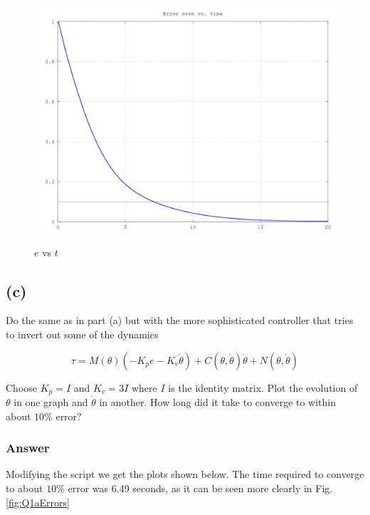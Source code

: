 \documentclass[10pt,a4paper]{article}
\begin{document}
\begin{figure}[H]
  \centering
  \includegraphics[angle = 0, scale = 0.3]{figures/Question1bErrors.png} 
  \label{fig:Q1bErrors}
  \caption{$e$ vs $t$}
\end{figure}


\subsection*{(c)}
Do the same as in part (a) but with the more sophisticated controller that tries to invert out some of the dynamics

\[ \tau = M(\theta)\left ( -K_{p}e - K_{v}\dot{\theta} \right )  + C(\theta, \dot{\theta})\dot{\theta} + N(\theta, \dot{\theta}) \]

Choose $K_{p} = I$ and $K_{v} = 3I$ where $I$ is the identity matrix. Plot the evolution of $\theta$ in one graph and $\dot{\theta}$ in another. How long did it take to converge to within about $10\%$ error?

\subsubsection*{Answer}
Modifying the script we get the plots shown below. The time required to converge to about $10\%$ error was 6.49 seconds, as it can be seen more clearly in Fig. \ref{fig:Q1aErrors}
\end{document}
